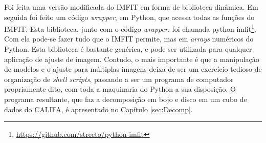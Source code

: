 Foi feita uma versão modificada do IMFIT em forma de biblioteca dinâmica. Em
seguida foi feito um código {\em wrapper}, em Python, que acessa todas as
funções do IMFIT. Esta biblioteca, junto com o código {\em wrapper}. foi chamada
python-imfit\footnote{\url{https://github.com/streeto/python-imfit}}. Com ela
pode-se fazer tudo que o IMFIT permite, mas em {\em arrays} numéricos do Python.
Esta biblioteca é bastante genérica, e pode ser utilizada para qualquer
aplicação de ajuste de imagem. Contudo, o mais importante é que a manipulação de
modelos e o ajuste para múltiplas imagens deixa de ser um exercício tedioso de
organização de {\em shell scripts}, passando a ser um programa de computador
propriamente dito, com toda a maquinaria do Python a sua disposição.
O programa resultante, que faz a decomposição em bojo e disco em um cubo de
dados do CALIFA, é apresentado no Capítulo \ref{sec:Decomp}.

